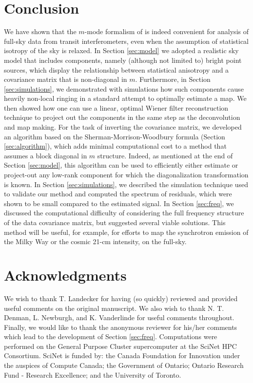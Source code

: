 \section{Conclusion}
\label{sec:conclusions}
We have shown that the $m$-mode formalism of \cite{mmodes1, mmodes2} is indeed convenient for analysis of full-sky data from transit interferometers, even when the assumption of statistical isotropy of the sky is relaxed. In Section \ref{sec:model} we adopted a realistic sky model that includes components, namely (although not limited to) bright point sources, which display the relationship between statistical anisotropy and a covariance matrix that is non-diagonal in $m$. Furthermore, in Section \ref{sec:simulations}, we demonstrated with simulations how such components cause heavily non-local ringing in a standard attempt to optimally estimate a map. We then showed how one can use a linear, optimal Wiener filter reconstruction technique to project out the components in the same step as the deconvolution and map making. For the task of inverting the covariance matrix, we developed an algorithm based on the Sherman-Morrison-Woodbury formula (Section \ref{sec:algorithm}), which adds minimal computational cost to a method that assumes a block diagonal in $m$ structure. Indeed, as mentioned at the end of Section \ref{sec:model}, this algorithm can be used to efficiently either estimate or project-out any low-rank component for which the diagonalization transformation is known. In Section \ref{sec:simulations}, we described the simulation technique used to validate our method and computed the spectrum of residuals, which were shown to be small compared to the estimated signal. In Section \ref{sec:freq}, we discussed the computational difficulty of considering the full frequency structure of the data covariance matrix, but suggested several viable solutions. This method will be useful, for example, for efforts to map the synchrotron emission of the Milky Way or the cosmic 21-cm intensity, on the full-sky.

\section*{Acknowledgments}

We wish to thank T. Landecker for having (so quickly) reviewed and provided useful comments on the original manuscript. We also wish to thank N. T. Denman, L. Newburgh, and K. Vanderlinde for useful comments throughout. Finally, we would like to thank the anonymous reviewer for his/her comments which lead to the development of Section \ref{sec:freq}.  Computations were performed on the General Purpose Cluster supercomputer at the SciNet HPC Consortium. \citep{scinet} SciNet is funded by: the Canada Foundation for Innovation under the auspices of Compute Canada; the Government of Ontario; Ontario Research Fund - Research Excellence; and the University of Toronto.

